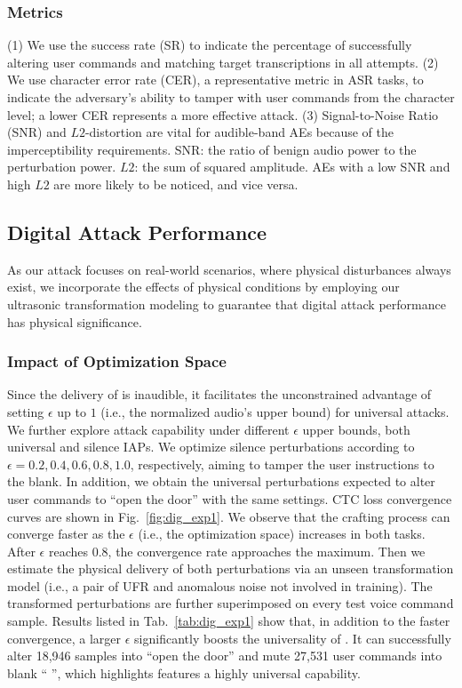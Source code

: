 \subsubsection{Metrics} (1) We use the success rate (SR) to indicate the percentage of \alias successfully altering user commands and matching target transcriptions in all attempts. (2) We use character error rate (CER), a representative metric in ASR tasks, to indicate the adversary's ability to tamper with user commands from the character level; a lower CER represents a more effective attack. (3) Signal-to-Noise Ratio (SNR) and $L2$-distortion are vital for audible-band AEs because of the imperceptibility requirements. SNR: the ratio of benign audio power to the perturbation power. $L2$: the sum of squared amplitude. AEs with a low SNR and high $L2$ are more likely to be noticed, and vice versa.

\subsection{Digital Attack Performance}
As our attack focuses on real-world scenarios, where physical disturbances always exist, we incorporate the effects of physical conditions by employing our ultrasonic transformation modeling to guarantee that digital attack performance has physical significance. %

\subsubsection{Impact of Optimization Space} %
Since the delivery of \alias is inaudible, it facilitates the unconstrained advantage of setting $\epsilon$ up to $1$ (i.e., the normalized audio's upper bound) for universal attacks. We further explore attack capability under different $\epsilon$ upper bounds, both universal and silence IAPs.
We optimize silence perturbations according to $\epsilon=0.2, 0.4, 0.6, 0.8, 1.0$, respectively, aiming to tamper the user instructions to the blank. In addition, we obtain the universal perturbations expected to alter user commands to ``open the door'' with the same settings. CTC loss convergence curves are shown in Fig.~\ref{fig:dig_exp1}. We observe that the crafting process can converge faster as the $\epsilon$ (i.e., the optimization space) increases in both tasks. After $\epsilon$ reaches $0.8$, the convergence rate approaches the maximum.
Then we estimate the physical delivery of both perturbations via an unseen transformation model (i.e., a pair of UFR and anomalous noise not involved in training). The transformed perturbations are further superimposed on every test voice command sample. Results listed in Tab.~\ref{tab:dig_exp1} show that, in addition to the faster convergence, a larger $\epsilon$ significantly boosts the universality of \alias. It can successfully alter 18,946 samples into ``open the door'' and mute 27,531 user commands into blank `` '', which highlights \alias features a highly universal capability.  %


